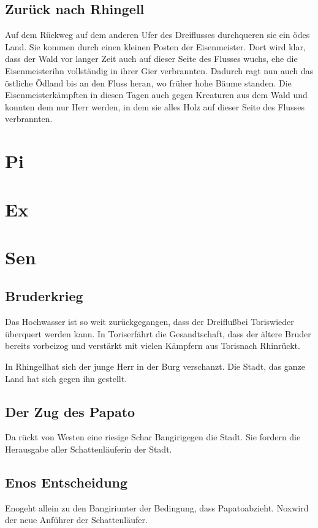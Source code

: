 \documentclass[12pt,a4paper,onecolumn,twoside,ngerman]{book}
\newcommand{\Bangiri}{Bangiri}
\newcommand{\Papato}{Papato}
\newcommand{\Schattenjager}{Schattenläufer}
\newcommand{\Eno}{Eno}
\newcommand{\Nox}{Nox}
\newcommand{\Rhingell}{Rhingell}
\newcommand{\Rhin}{Rhin}
\newcommand{\Dreifluss}{Dreifluß}
\newcommand{\Toris}{Toris}
\newcommand{\Eisenmeister}{Eisenmeister}
\begin{document}
\section{Zurück nach \Rhingell}
Auf dem Rückweg auf dem anderen Ufer des Dreiflusses durchqueren sie ein ödes Land. Sie kommen durch einen kleinen Posten der \Eisenmeister. Dort wird klar, dass der Wald vor langer Zeit auch auf dieser Seite des Flusses wuchs, ehe die \Eisenmeister ihn vollständig in ihrer Gier verbrannten. Dadurch ragt nun auch das östliche Ödland bis an den Fluss heran, wo früher hohe Bäume standen. Die \Eisenmeister kämpften in diesen Tagen auch gegen Kreaturen aus dem Wald und konnten dem nur Herr werden, in dem sie alles Holz auf dieser Seite des Flusses verbrannten.

\chapter{Pi}

\chapter{Ex}

\chapter{Sen}
\section{Bruderkrieg}
Das Hochwasser ist so weit zurückgegangen, dass der \Dreifluss bei \Toris wieder überquert werden kann. In \Toris erfährt die Gesandtschaft, dass der ältere Bruder bereits vorbeizog und verstärkt mit vielen Kämpfern aus \Toris nach \Rhin rückt. 

In \Rhingell hat sich der junge Herr in der Burg verschanzt. Die Stadt, das ganze Land hat sich gegen ihn gestellt. 

\section{Der Zug des \Papato}
Da rückt von Westen eine riesige Schar \Bangiri gegen die Stadt. Sie fordern die Herausgabe aller \Schattenjager in der Stadt.

\section{{\Eno}s Entscheidung}
\Eno geht allein zu den \Bangiri unter der Bedingung, dass \Papato abzieht. \Nox wird der neue Anführer der Schattenläufer.
\end{document}
